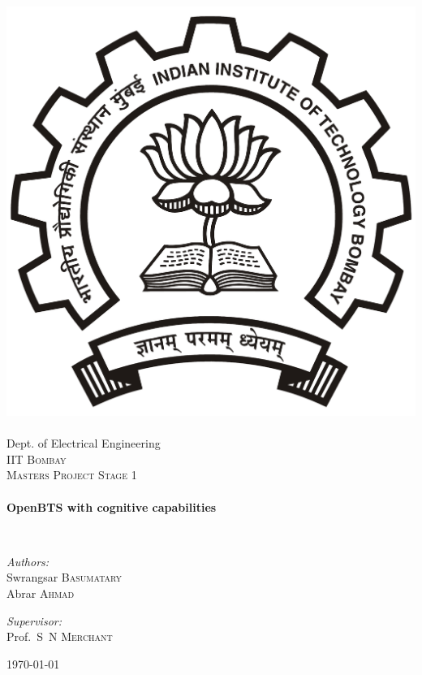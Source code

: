 \begin{titlepage}
\begin{center}

\includegraphics[width=0.23\textheight]{iitbLogo}~\\[1cm]
Dept. of Electrical Engineering\\[0.3cm]
\textsc{\LARGE IIT Bombay}\\[1.5cm]

\textsc{\Large Masters Project Stage 1}\\[0.5cm]

\HRule \\[0.4cm]
{ \huge \bfseries OpenBTS with cognitive capabilities\\[0.4cm] }

\HRule \\[1.5cm]

\begin{minipage}{0.4\textwidth}
\begin{flushleft} \large
\emph{Authors:}\\
Swrangsar \textsc{Basumatary}\\
Abrar \textsc{Ahmad}
\end{flushleft}
\end{minipage}
\begin{minipage}{0.4\textwidth}
\begin{flushright} \large
\emph{Supervisor:} \\
Prof.~S~N \textsc{Merchant}
\end{flushright}
\end{minipage}

\vfill

{\large \today}

\end{center}
\end{titlepage}
